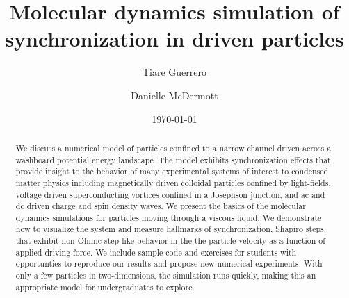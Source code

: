 \documentclass[twocolumn,preprintnumbers,amsmath,amssymb,aps,prx]{revtex4}
\begin{document}

\title{Molecular dynamics simulation of synchronization in driven particles}

\author{Tiare Guerrero}

\author{Danielle McDermott}

\date{\today}

\begin{abstract}
  We discuss a
  numerical model
  of particles
  confined to a narrow channel 
  driven
  across a washboard potential energy landscape.
  The model 
  exhibits
  synchronization effects that provide insight
  to the behavior of 
  many experimental systems of
  interest to condensed matter physics 
  including 
  magnetically driven colloidal particles
  confined by light-fields, 
  voltage driven superconducting vortices
  confined in a Josephson junction,
  and ac and dc driven
  charge and spin density waves.
  We present the basics
  of the molecular dynamics simulations
  for particles moving through
  a viscous liquid.
  We demonstrate how to visualize
  the system
  and measure hallmarks of synchronization, 
  Shapiro steps,
  that exhibit non-Ohmic step-like behavior 
  in the 
  the particle velocity as a function of applied driving force.
  We include sample code
  and exercises for students
  with 
  opportunties
  to reproduce our results and propose
  new numerical experiments.
  With only a few particles in two-dimensions,
  the simulation runs quickly,
  making this an appropriate model for undergraduates to explore.

  
\end{abstract}
\end{document}
